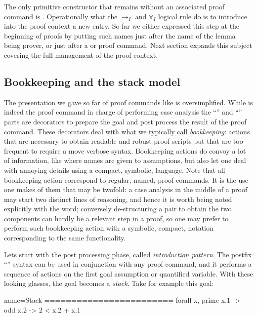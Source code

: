 The only primitive constructor that remains without an associated proof command
is .  Operationally what the $\to_I$ and
$\forall_I$ logical rule do is to introduce into the proof context a
new entry.  So far we either expressed this step at the beginning of proofs
by putting such names just after the name of the lemma being prover, or
just after a  or  proof command.  Next section
expands this subject covering the full management of the proof context.

\subsection{Bookkeeping and the stack model}

The presentation we gave so far of proof commands like 
is oversimplified.  While  is indeed the proof command in
charge of performing case analysis the ``'' and ``\C{=> [|m]}''
parts are decorators to prepare the goal and post process the result of
the proof command.  These decorators deal with what we typically call
\emph{bookkeeping}: actions that are necessary to obtain readable and
robust proof scripts but that are too frequent to require a move verbose
syntax.  Bookkeeping actions do convoy a lot of information, like where
names are given to assumptions, but also let one deal with annoying details
using a compact, symbolic, language.  Note that all bookkeeping action
correspond to regular, named, proof commands.  It is the use one makes of them
that may be twofold: a case analysis in the middle of a proof may start two
distinct lines of reasoning, and hence it is worth being noted explicitly with
the  word; conversely de-structuring a pair to obtain the two
components can hardly be a relevant step in a proof, so one may prefer to
perform such bookkeeping action with a symbolic, compact, notation
corresponding to the same  functionality.

Lets start with the post processing phase, called \emph{introduction pattern}.
The postfix ``'' syntax can be used in conjunction with any proof
command, and it performs a sequence of actions on the first goal assumption or
quantified variable.  With these looking glasses, the goal becomes a
\emph{stack}. Take for example this goal:

\begin{coqout}{name=Stack}{}
========================
forall x, prime x.1 -> odd x.2 -> 2 < x.2 + x.1
\end{coqout}

